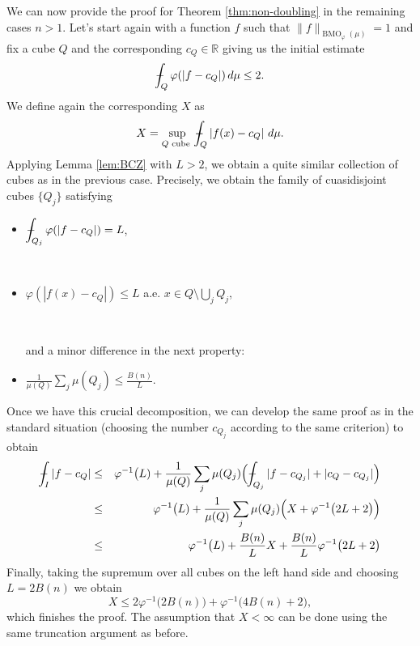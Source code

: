 \documentclass[11pt,a4paper]{amsart}
\theoremstyle{definition}
\theoremstyle{remark}
\numberwithin{equation}{section}
\DeclareMathOperator{\BMO}{BMO}
\def\R{{\mathbb R}}
\def\Xint#1{\mathchoice
  {\XXint\displaystyle\textstyle{#1}}%
  {\XXint\textstyle\scriptstyle{#1}}%
  {\XXint\scriptstyle\scriptscriptstyle{#1}}%
  {\XXint\scriptscriptstyle\scriptscriptstyle{#1}}%
  \!\int}
\def\XXint#1#2#3{{\setbox0=\hbox{$#1{#2#3}{\int}$}
    \vcenter{\hbox{$#2#3$}}\kern-.5\wd0}}
\def\avgint{\Xint-}
\numberwithin{equation}{section}
\begin{document}
We can now provide the proof for Theorem \ref{thm:non-doubling} in the remaining cases $n>1$. Let's start again with a function $f$ such that $\|f\|_{\BMO_\varphi(\mu)}=1$ and fix a cube $Q$ and the corresponding $c_Q\in \R$ giving us the initial estimate
 \begin{equation*}
\avgint_Q \varphi(|f-c_Q|)\,d\mu \leq 2.
\end{equation*}
We define again the corresponding $X$ as
\begin{equation*}%
X = \sup_{Q \text{ cube } } \avgint_Q |f(x)-c_Q|\ d\mu.
\end{equation*}
Applying Lemma \ref{lem:BCZ} with $L>2$, we obtain a quite similar collection of cubes as in the previous case. Precisely, we obtain the family of cuasidisjoint cubes $\{Q_j\}$ satisfying
\begin{itemize}
\item $\displaystyle  \avgint_{Q_j} \varphi(|f-c_Q|) = L$,

\

\item $\varphi(|f(x)-c_Q|) \leq L $ \quad a.e. $\displaystyle x\in Q\setminus \bigcup_j Q_j$,

\

and a minor difference in the next property:
\item $\displaystyle\frac{1}{\mu(Q)}\sum_j \mu(Q_j) \leq \frac{B(n)}{L}.$
\end{itemize}
Once we have this crucial decomposition, we can develop the same proof as in the standard situation (choosing the number $c_{Q_j}$ according to the same criterion)  to obtain
\begin{eqnarray*}
\avgint_I |f-c_Q| & \leq & \varphi^{-1} \big(L) + \frac{1}{\mu(Q)} \sum_j \mu(Q_j)\Big(  \avgint_{Q_j} |f-c_{Q_j}| + |c_Q-c_{Q_j}|\Big)\\
 & \leq & \varphi^{-1}\big(L) + \frac{1}{\mu(Q)} \sum_j \mu(Q_j)\Big(  X + \varphi^{-1} \big( 2L+2\big)\Big) \\
 & \leq & \varphi^{-1} \big(L)  + \frac{B(n)}{L}X+\frac{B(n)}{L}\varphi^{-1} \big( 2L+2\big)
\end{eqnarray*}
Finally, taking the supremum over all cubes on the left hand side and choosing $L=2B(n)$ we obtain 
%
\begin{equation*}
X \leq 2\varphi^{-1} \big(2B(n))  + \varphi^{-1} \big(4B(n)+2),
\end{equation*}
which finishes the proof. The assumption that $X<\infty$ can be done using the same truncation argument as before.
\end{document}

